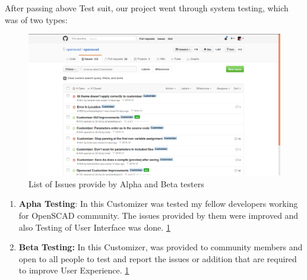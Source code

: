 After passing above Test suit, our project went through system testing, which was of two types:
\begin{figure}
\centering
\includegraphics[width=\linewidth]{images/Issues}
\caption{List of Issues provide by Alpha and Beta testers}
\label{fig:Issues}
\end{figure}

\begin{enumerate}
    \item \textbf{Apha Testing}: In this Customizer was tested my fellow developers working for OpenSCAD community. The issues provided by them were improved and also Testing of User Interface was done. \ref{fig:Issues}
   
    \item \textbf{Beta Testing:} In this Customizer, was provided to community members and open to all people to test and report the issues or addition that are required to improve User Experience. \ref{fig:Issues}
   
\end{enumerate}

		
		
